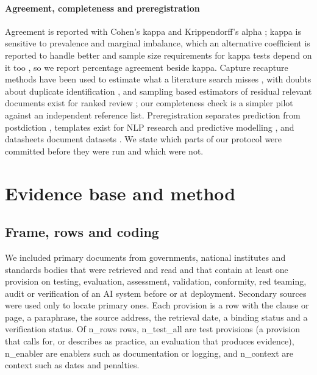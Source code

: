\documentclass[conference]{IEEEtran}
\begin{document}
\paragraph{Agreement, completeness and preregistration} Agreement is reported with Cohen's kappa \citep{mchugh2012interrater} and Krippendorff's alpha \citep{krippendorff2011computing}; kappa is sensitive to prevalence and marginal imbalance, which an alternative coefficient is reported to handle better \citep{wongpakaran2013comparison} and sample size requirements for kappa tests depend on it too \citep{bujang2017guidelines}, so we report percentage agreement beside kappa. Capture recapture methods have been used to estimate what a literature search misses \citep{spoor1996use,kastner2009capture,stelfox2013capture}, with doubts about duplicate identification \citep{motschall2009number}, and sampling based estimators of residual relevant documents exist for ranked review \citep{li2020stop}; our completeness check is a simpler pilot against an independent reference list. Preregistration separates prediction from postdiction \citep{nosek2018preregistration}, templates exist for NLP research and predictive modelling \citep{vanmiltenburg2021preregistering,hofman2023preregistration}, and datasheets document datasets \citep{gebru2021datasheets}. We state which parts of our protocol were committed before they were run and which were not.

\section{Evidence base and method}\label{sec:method}
\subsection{Frame, rows and coding}
We included primary documents from governments, national institutes and standards bodies that were retrieved and read and that contain at least one provision on testing, evaluation, assessment, validation, conformity, red teaming, audit or verification of an AI system before or at deployment. Secondary sources were used only to locate primary ones. Each provision is a row with the clause or page, a paraphrase, the source address, the retrieval date, a binding status and a verification status. Of {{n_rows}} rows, {{n_test_all}} are test provisions (a provision that calls for, or describes as practice, an evaluation that produces evidence), {{n_enabler}} are enablers such as documentation or logging, and {{n_context}} are context such as dates and penalties.
\end{document}
